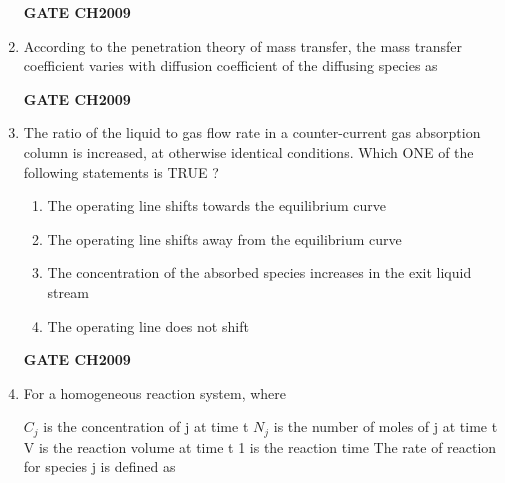\documentclass[journal,12pt,onecolumn]{IEEEtran}
\theoremstyle{remark}
\begin{document}
\begin{enumerate}
		\hfill
		\textbf{GATE CH2009} 
		
		\item According to the penetration theory of mass transfer, the mass transfer coefficient  varies with diffusion coefficient  of the diffusing species as 
		\begin{enumerate}
		\end{enumerate} 
		
		\hfill
		\textbf{GATE CH2009} 
		
		\item The ratio of the liquid to gas flow rate in a counter-current gas absorption column is increased, at otherwise identical conditions. Which ONE of the following statements is TRUE ? 
		\begin{enumerate}
			\item  The operating line shifts towards the equilibrium curve
			\item  The operating line shifts away from the equilibrium curve
			\item  The concentration of the absorbed species increases in the exit liquid stream
			\item The operating line does not shift
		\end{enumerate} 
		
		\hfill
		\textbf{GATE CH2009} 
		
		\item For a homogeneous reaction system, where
		
		$C_{j}$ is the concentration of j at time t
		$N_{j}$ is the number of moles of j at time t
		V is the reaction volume at time t
		1 is the reaction time
		The rate of reaction for species j is defined as 
		\begin{enumerate} 
		\end{enumerate}
		

\end{enumerate}
\end{document}
